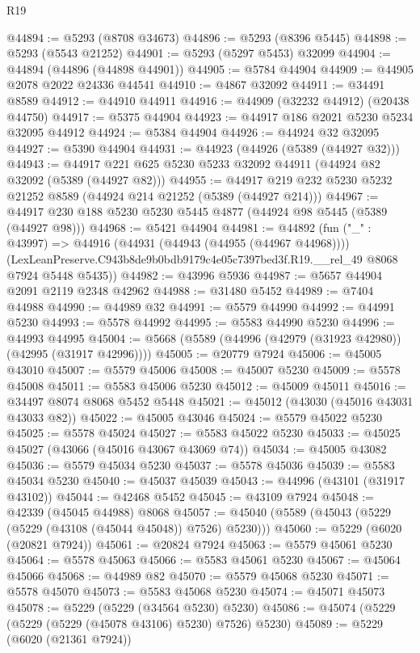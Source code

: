 \begin{lexlean}{R19}
\begin{coremodule}
@44894 := @5293 (@8708 @34673)
@44896 := @5293 (@8396 @5445)
@44898 := @5293 (@5543 @21252)
@44901 := @5293 (@5297 @5453) @32099
@44904 := @44894 (@44896 (@44898 @44901))
@44905 := @5784 @44904
@44909 := @44905 @2078 @2022 @24336 @44541
@44910 := @4867 @32092
@44911 := @34491 @8589
@44912 := @44910 @44911
@44916 := @44909 (@32232 @44912) (@20438 @44750)
@44917 := @5375 @44904
@44923 := @44917 @186 @2021 @5230 @5234 @32095 @44912
@44924 := @5384 @44904
@44926 := @44924 @32 @32095
@44927 := @5390 @44904
@44931 := @44923 (@44926 (@5389 (@44927 @32)))
@44943 := @44917 @221 @625 @5230 @5233 @32092 @44911 (@44924 @82 @32092 (@5389 (@44927 @82)))
@44955 := @44917 @219 @232 @5230 @5232 @21252 @8589 (@44924 @214 @21252 (@5389 (@44927 @214)))
@44967 := @44917 @230 @188 @5230 @5230 @5445 @4877 (@44924 @98 @5445 (@5389 (@44927 @98)))
@44968 := @5421 @44904
@44981 := @44892
    (fun ("_" : @43997) =>
    @44916
      (@44931 (@44943 (@44955 (@44967 @44968))))
      (LexLeanPreserve.C943b8de9b0bdb9179c4e05c7397bed3f.R19.__rel_49 @8068 @7924 @5448 @5435))
@44982 := @43996 @5936
@44987 := @5657 @44904 @2091 @2119 @2348 @42962
@44988 := @31480 @5452
@44989 := @7404 @44988
@44990 := @44989 @32
@44991 := @5579 @44990
@44992 := @44991 @5230
@44993 := @5578 @44992
@44995 := @5583 @44990 @5230
@44996 := @44993 @44995
@45004 := @5668 (@5589 (@44996 (@42979 (@31923 @42980)) (@42995 (@31917 @42996))))
@45005 := @20779 @7924
@45006 := @45005 @43010
@45007 := @5579 @45006
@45008 := @45007 @5230
@45009 := @5578 @45008
@45011 := @5583 @45006 @5230
@45012 := @45009 @45011
@45016 := @34497 @8074 @8068 @5452 @5448
@45021 := @45012 (@43030 (@45016 @43031 @43033 @82))
@45022 := @45005 @43046
@45024 := @5579 @45022 @5230
@45025 := @5578 @45024
@45027 := @5583 @45022 @5230
@45033 := @45025 @45027 (@43066 (@45016 @43067 @43069 @74))
@45034 := @45005 @43082
@45036 := @5579 @45034 @5230
@45037 := @5578 @45036
@45039 := @5583 @45034 @5230
@45040 := @45037 @45039
@45043 := @44996 (@43101 (@31917 @43102))
@45044 := @42468 @5452
@45045 := @43109 @7924
@45048 := @42339 (@45045 @44988) @8068
@45057 := @45040 (@5589 (@45043 (@5229 (@5229 (@43108 (@45044 @45048)) @7526) @5230)))
@45060 := @5229 (@6020 (@20821 @7924))
@45061 := @20824 @7924
@45063 := @5579 @45061 @5230
@45064 := @5578 @45063
@45066 := @5583 @45061 @5230
@45067 := @45064 @45066
@45068 := @44989 @82
@45070 := @5579 @45068 @5230
@45071 := @5578 @45070
@45073 := @5583 @45068 @5230
@45074 := @45071 @45073
@45078 := @5229 (@5229 (@34564 @5230) @5230)
@45086 := @45074 (@5229 (@5229 (@5229 (@45078 @43106) @5230) @7526) @5230)
@45089 := @5229 (@6020 (@21361 @7924))

\end{coremodule}
\end{lexlean}
